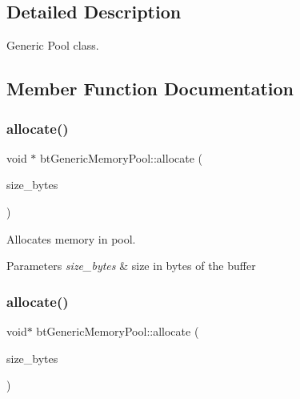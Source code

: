 \subsection{Detailed Description}
Generic Pool class. 

\subsection{Member Function Documentation}
\mbox{\label{classbtGenericMemoryPool_acd47d75d6fbd7dbf6f0d7849e0bd9ec1}} 
\subsubsection{\texorpdfstring{allocate()}{allocate()}\hspace{0.1cm}{\footnotesize\ttfamily [1/2]}}
{\footnotesize\ttfamily void $\ast$ bt\+Generic\+Memory\+Pool\+::allocate (\begin{DoxyParamCaption}\item[{size\+\_\+t}]{size\+\_\+bytes }\end{DoxyParamCaption})}



Allocates memory in pool. 


\begin{DoxyParams}{Parameters}
{\em size\+\_\+bytes} & size in bytes of the buffer \\
\hline
\end{DoxyParams}
\mbox{\label{classbtGenericMemoryPool_aa582a92d2bae1a7b158c70e144d6cff9}} 
\subsubsection{\texorpdfstring{allocate()}{allocate()}\hspace{0.1cm}{\footnotesize\ttfamily [2/2]}}
{\footnotesize\ttfamily void$\ast$ bt\+Generic\+Memory\+Pool\+::allocate (\begin{DoxyParamCaption}\item[{size\+\_\+t}]{size\+\_\+bytes }\end{DoxyParamCaption})}



